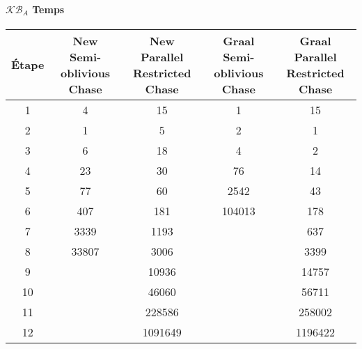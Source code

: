 \paragraph{$\mathcal{KB}_A$ Temps}
\begin{center}
\begin{tabular}{|c||c|c|c|c|}
    \hline
    Étape & \shortstack{New \\ Semi-oblivious Chase} & \shortstack{New \\ Parallel Restricted Chase} & \shortstack{Graal \\ Semi-oblivious Chase} & \shortstack{Graal \\ Parallel Restricted Chase} \\
    \hline
     \hline
    1 & 4 & 15 & 1 & 15 \\ 
    \hline
    2 & 1 & 5 & 2 & 1 \\ 
    \hline
    3 & 6 & 18 & 4 & 2 \\ 
    \hline
    4 & 23 & 30 & 76 & 14 \\ 
     \hline
    5 & 77 & 60 & 2542 & 43 \\ 
    \hline
    6 & 407 & 181 & 104013 & 178 \\ 
    \hline
    7 & 3339 & 1193 &  & 637 \\ 
    \hline
    8 & 33807 & 3006 &  & 3399 \\ 
    \hline
    9 &  & 10936 &  & 14757 \\ 
    \hline
    10 &  & 46060 &  & 56711 \\ 
     \hline
    11 &  & 228586 &  & 258002 \\ 
    \hline
    12 &  & 1091649 &  & 1196422 \\ 
     \hline
\end{tabular}
\end{center}

